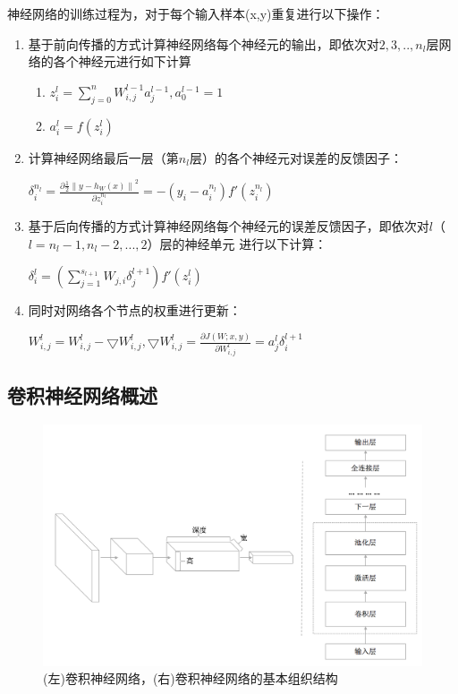 神经网络的训练过程为，对于每个输入样本(x,y)重复进行以下操作：
\begin{enumerate}[1.]
  \item 基于前向传播的方式计算神经网络每个神经元的输出，即依次对$2,3,..,n_{l}$层网络的各个神经元进行如下计算
  \begin{enumerate}
    \item $z_{i}^{l} = \sum_{j=0}^{n}W_{i,j}^{l-1}a_{j}^{l-1}, a_{0}^{l-1}=1$
    \item $a_{i}^{l} = f(z_{i}^{l})$
  \end{enumerate}
  \item 计算神经网络最后一层（第$n_{l}$层）的各个神经元对误差的反馈因子：

  $\delta_{i}^{n_{l}} = \frac{\partial \frac{1}{2} \left \| y - h_{W}(x) \right \|^{2}}{\partial z_{i}^{n_{l}}} = -(y_{i}-a_{i}^{n_{l}} )f'(z_{i}^{n_{l}})$

  \item 基于后向传播的方式计算神经网络每个神经元的误差反馈因子，即依次对$l$（$l=n_{l}-1, n_{l}-2, ..., 2$）层的神经单元 进行以下计算：

  $\delta_{i}^{l} =(\sum_{j=1}^{s_{l+1}}W_{j,i}\delta_{j}^{l+1})f'(z_{i}^{l})$

  \item 同时对网络各个节点的权重进行更新：

  $W_{i,j}^{l} = W_{i,j}^{l}- \bigtriangledown W_{i,j}^{l}, \bigtriangledown W_{i,j}^{l} = \frac{\partial J(W;x,y)}{\partial W_{i,j}^{l}} = a_{j}^{l}\delta_{i}^{l+1}$

\end{enumerate}

\subsection{卷积神经网络概述}
\label{tsgan-cnn}

\begin{figure}[H]
\centering
\includegraphics[scale=0.5]{figures/gan-cnn.png}
\caption{(左)卷积神经网络，(右)卷积神经网络的基本组织结构}
\label{fig:gan-cnn}
\end{figure}


